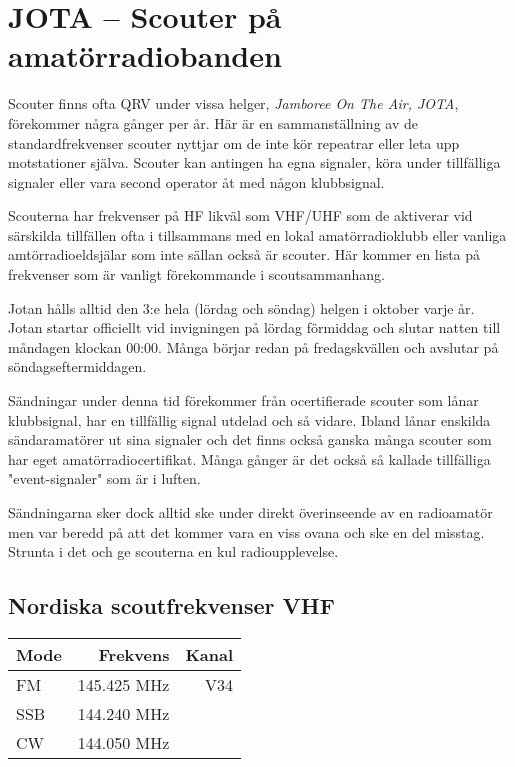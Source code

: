 \normalsize

\section{JOTA -- Scouter på amatörradiobanden}

Scouter finns ofta QRV under vissa helger, \textit{Jamboree On The Air, JOTA},
förekommer några gånger per år. Här är en sammanställning av de
standardfrekvenser scouter nyttjar om de inte kör repeatrar eller leta upp
motstationer själva. Scouter kan antingen ha egna signaler, köra under
tillfälliga signaler eller vara second operator åt med någon klubbsignal.

Scouterna har frekvenser på HF likväl som VHF/UHF som de aktiverar vid
särskilda tillfällen ofta i tillsammans med en lokal amatörradioklubb eller
vanliga amtörradioeldsjälar som inte sällan också är scouter. Här kommer en
lista på frekvenser som är vanligt förekommande i scoutsammanhang.

Jotan hålls alltid den 3:e hela (lördag och söndag) helgen i oktober varje år.
Jotan startar officiellt vid invigningen på lördag förmiddag och slutar natten
till måndagen klockan 00:00. Många börjar redan på fredagskvällen och avslutar
på söndagseftermiddagen.

Sändningar under denna tid förekommer från ocertifierade scouter som lånar
klubbsignal, har en tillfällig signal utdelad och så vidare. Ibland lånar
enskilda sändaramatörer ut sina signaler och det finns också ganska många
scouter som har eget amatörradiocertifikat. Många gånger är det också så
kallade tillfälliga "event-signaler" som är i luften.

Sändningarna sker dock alltid ske under direkt överinseende av en radioamatör
men var beredd på att det kommer vara en viss ovana och ske en del misstag.
Strunta i det och ge scouterna en kul radioupplevelse.

\subsection{Nordiska scoutfrekvenser VHF}

\begin{center}
\begin{tabular}{lrr}
	\textbf{Mode} & \textbf{Frekvens} & \textbf{Kanal} \\ \hline
	FM            &      145.425  MHz &   V34 \\
	SSB           &      144.240  MHz &  \\
	CW            &      144.050  MHz &
\end{tabular}
\end{center}

